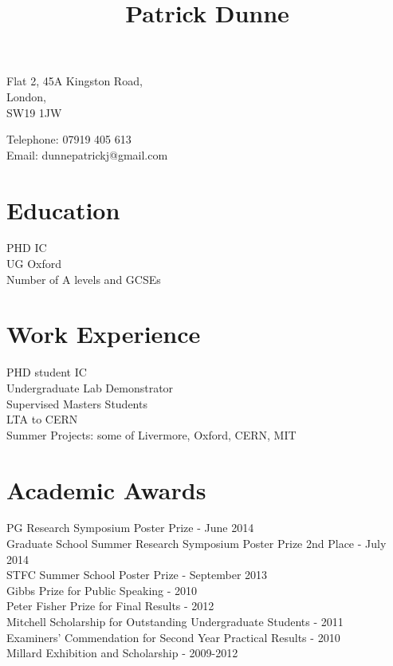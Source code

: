 \documentclass[12pt]{article}
\begin{document}
\title{Patrick Dunne}
\author{}
\date{}
\maketitle

\begin{multicols}{2}
  \raggedright
  Flat 2, 45A Kingston Road,\\
  London,\\
  SW19 1JW

  \columnbreak

  Telephone: 07919 405 613\\
  Email: dunnepatrickj@gmail.com
\end{multicols}

\section*{Education}
PHD IC \\
UG Oxford \\
Number of A levels and GCSEs \\
\section*{Work Experience}
PHD student IC \\
Undergraduate Lab Demonstrator \\
Supervised Masters Students \\
LTA to CERN \\
Summer Projects: some of Livermore, Oxford, CERN, MIT \\
\section*{Academic Awards}
PG Research Symposium Poster Prize - June 2014 \\
Graduate School Summer Research Symposium Poster Prize 2nd Place - July 2014 \\
STFC Summer School Poster Prize - September 2013 \\
Gibbs Prize for Public Speaking - 2010 \\
Peter Fisher Prize for Final Results - 2012 \\
Mitchell Scholarship for Outstanding Undergraduate Students - 2011 \\
Examiners' Commendation for Second Year Practical Results - 2010 \\
Millard Exhibition and Scholarship - 2009-2012 \\
\end{document}
